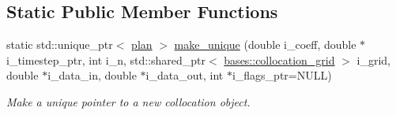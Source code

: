 \subsection*{Static Public Member Functions}
\begin{DoxyCompactItemize}
\item 
static std\-::unique\-\_\-ptr$<$ \hyperlink{classbases_1_1plan_a7b4ddc2f876b9e4dcf899feb20ae369f}{plan} $>$ \hyperlink{classone__d_1_1explicit__diffusion_a4cf592aa3ac5adea614d44c0b33f9136}{make\-\_\-unique} (double i\-\_\-coeff, double $\ast$i\-\_\-timestep\-\_\-ptr, int i\-\_\-n, std\-::shared\-\_\-ptr$<$ \hyperlink{classbases_1_1collocation__grid}{bases\-::collocation\-\_\-grid} $>$ i\-\_\-grid, double $\ast$i\-\_\-data\-\_\-in, double $\ast$i\-\_\-data\-\_\-out, int $\ast$i\-\_\-flags\-\_\-ptr=N\-U\-L\-L)
\begin{DoxyCompactList}\small\item\em Make a unique pointer to a new collocation object. \end{DoxyCompactList}\end{DoxyCompactItemize}
